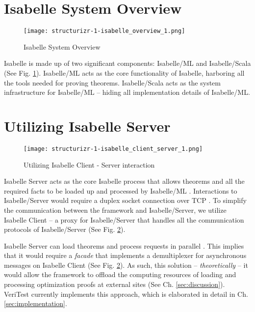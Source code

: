 \section{Isabelle System Overview}
\label{sec:IsabelleSystemOverview}

\begin{figure}[!htb]
      \centering
      \texttt{[image: structurizr-1-isabelle\_overview\_1.png]}
      \caption{Isabelle System Overview}
      \label{fig:IsabelleSystem}
\end{figure}

Isabelle is made up of two significant components: Isabelle/ML and Isabelle/Scala \cite[Ch. 5]{isabelleSystem} (See Fig. \ref{fig:IsabelleSystem}). 
Isabelle/ML acts as the core functionality of Isabelle, harboring all the tools needed for proving theorems. Isabelle/Scala acts as the system 
infrastructure for Isabelle/ML -- hiding all implementation details of Isabelle/ML.

\section{Utilizing Isabelle Server}
\label{sec:IsabelleServer}

\begin{figure}[!htb]
      \centering
      \texttt{[image: structurizr-1-isabelle\_client\_server\_1.png]}
      \caption{Utilizing Isabelle Client - Server interaction}
      \label{fig:IsabelleServer}
\end{figure}

Isabelle Server acts as the core Isabelle process that allows theorems and all the required facts to be loaded up and processed by Isabelle/ML
\cite[Ch. 4]{isabelleSystem}. Interactions to Isabelle/Server would require a duplex socket connection over TCP \cite[Sec. 4.2]{isabelleSystem}. 
To simplify the communication between the framework and Isabelle/Server, we utilize Isabelle Client \cite[Sec. 4.1.2]{isabelleSystem} -- a proxy 
for Isabelle/Server that handles all the communication protocols of Isabelle/Server (See Fig. \ref{fig:IsabelleServer}).

Isabelle Server can load theorems and process requests in parallel \cite[Sec. 4.2.6]{isabelleSystem}. This implies that it would require a 
\emph{facade} that implements a demultiplexer for asynchronous messages on Isabelle Client (See Fig. \ref{fig:IsabelleServer}). As such, this 
solution -- \emph{theoretically} -- it would allow the framework to offload the computing resources of loading 
and processing optimization proofs at external sites (See Ch. \ref{sec:discussion}). VeriTest currently implements this approach, which is 
elaborated in detail in Ch. \ref{sec:implementation}.

